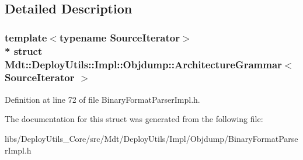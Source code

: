 \subsection{Detailed Description}
\subsubsection*{template$<$typename Source\+Iterator$>$\\*
struct Mdt\+::\+Deploy\+Utils\+::\+Impl\+::\+Objdump\+::\+Architecture\+Grammar$<$ Source\+Iterator $>$}



Definition at line 72 of file Binary\+Format\+Parser\+Impl.\+h.



The documentation for this struct was generated from the following file\+:\begin{DoxyCompactItemize}
\item 
libs/\+Deploy\+Utils\+\_\+\+Core/src/\+Mdt/\+Deploy\+Utils/\+Impl/\+Objdump/Binary\+Format\+Parser\+Impl.\+h\end{DoxyCompactItemize}
